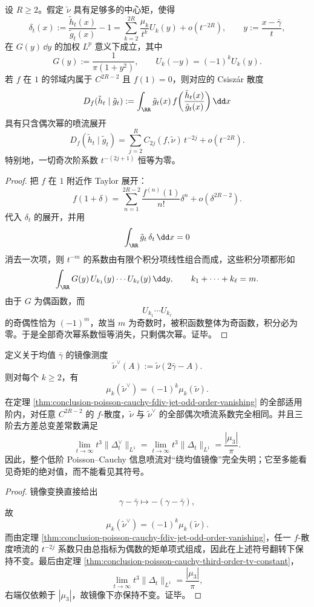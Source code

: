 \begin{theorem}\label{thm:conclusion-poisson-cauchy-fdiv-jet-odd-order-vanishing}
设 \(R\ge 2\)。假定 \(\tilde\nu\) 具有足够多的中心矩，使得
\[
\delta_t(x):=\frac{\tilde h_t(x)}{\tilde g_t(x)}-1
=
\sum_{k=2}^{2R}\frac{\mu_k}{t^k}U_k(y)+o(t^{-2R}),
\qquad
y:=\frac{x-\bar\gamma}{t},
\]
在 \(G(y)\,\dd y\) 的加权 \(L^p\) 意义下成立，其中
\[
G(y):=\frac{1}{\pi(1+y^2)},
\qquad
U_k(-y)=(-1)^kU_k(y).
\]
若 \(f\) 在 \(1\) 的邻域内属于 \(C^{2R-2}\) 且 \(f(1)=0\)，则对应的 Csisz\'ar 散度
\[
D_f(\tilde h_t\mid \tilde g_t)
:=
\int_{\RR}\tilde g_t(x)\,
f\!\left(\frac{\tilde h_t(x)}{\tilde g_t(x)}\right)\dd x
\]
具有只含偶次幂的喷流展开
\[
D_f(\tilde h_t\mid \tilde g_t)
=
\sum_{j=2}^{R}C_{2j}(f,\tilde\nu)\,t^{-2j}
+o(t^{-2R}).
\]
特别地，一切奇次阶系数 \(t^{-(2j+1)}\) 恒等为零。
\end{theorem}
\begin{proof}
把 \(f\) 在 \(1\) 附近作 Taylor 展开：
\[
f(1+\delta)
=
\sum_{n=1}^{2R-2}\frac{f^{(n)}(1)}{n!}\delta^n+o(\delta^{2R-2}).
\]
代入 \(\delta_t\) 的展开，并用
\[
\int_{\RR}\tilde g_t\,\delta_t\,\dd x=0
\]
消去一次项，则 \(t^{-m}\) 的系数由有限个积分项线性组合而成，这些积分项都形如
\[
\int_{\RR}G(y)\,U_{k_1}(y)\cdots U_{k_\ell}(y)\,\dd y,
\qquad
k_1+\cdots+k_\ell=m.
\]
由于 \(G\) 为偶函数，而
\[
U_{k_1}\cdots U_{k_\ell}
\]
的奇偶性恰为 \((-1)^m\)，故当 \(m\) 为奇数时，被积函数整体为奇函数，积分必为零。于是全部奇次幂系数恒等消失，只剩偶次幂。证毕。
\end{proof}

\begin{corollary}[镜像测度的完整喷流盲性]\label{cor:conclusion-poisson-cauchy-mirror-jet-blindness}
定义关于均值 \(\bar\gamma\) 的镜像测度
\[
\tilde\nu^\vee(A):=\tilde\nu(2\bar\gamma-A).
\]
则对每个 \(k\ge 2\)，有
\[
\mu_k(\tilde\nu^\vee)=(-1)^k\mu_k(\tilde\nu).
\]
在定理 \ref{thm:conclusion-poisson-cauchy-fdiv-jet-odd-order-vanishing} 的全部适用阶内，对任意 \(C^{2R-2}\) 的 \(f\)-散度，\(\tilde\nu\) 与 \(\tilde\nu^\vee\) 的全部偶次喷流系数完全相同。并且三阶去方差总变差常数满足
\[
\lim_{t\to\infty} t^3\|\Delta_t^\vee\|_{L^1}
=
\lim_{t\to\infty} t^3\|\Delta_t\|_{L^1}
=
\frac{|\mu_3|}{\pi}.
\]
因此，整个低阶 Poisson--Cauchy 信息喷流对“绕均值镜像”完全失明；它至多能看见奇矩的绝对值，而不能看见其符号。
\end{corollary}
\begin{proof}
镜像变换直接给出
\[
\gamma-\bar\gamma\longmapsto -(\gamma-\bar\gamma),
\]
故
\[
\mu_k(\tilde\nu^\vee)=(-1)^k\mu_k(\tilde\nu).
\]
而由定理 \ref{thm:conclusion-poisson-cauchy-fdiv-jet-odd-order-vanishing}，任一 \(f\)-散度喷流的 \(t^{-2j}\) 系数只由总指标为偶数的矩单项式组成，因此在上述符号翻转下保持不变。最后由定理 \ref{thm:conclusion-poisson-cauchy-third-order-tv-constant}，
\[
\lim_{t\to\infty}t^3\|\Delta_t\|_{L^1}=\frac{|\mu_3|}{\pi},
\]
右端仅依赖于 \(|\mu_3|\)，故镜像下亦保持不变。证毕。
\end{proof}

